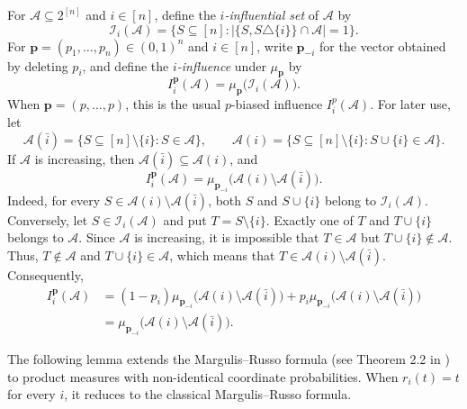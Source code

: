 \documentclass[11pt]{article}
\numberwithin{equation}{section}
\theoremstyle{definition}
\theoremstyle{remark}
\begin{document}
For $\mathcal{A}\subseteq2^{[n]}$ and $i\in[n]$, define the \textit{$i$-influential set} of $\mathcal{A}$ by
$$
        \mathcal{I}_i(\mathcal{A})
        =
        \{S\subseteq[n]:|\{S,S\triangle\{i\}\}\cap\mathcal{A}|=1\}.
$$
For $\mathbf p=(p_1,\ldots,p_n)\in(0,1)^n$ and $i\in[n]$, write
$\mathbf p_{-i}$ for the vector obtained by deleting $p_i$,  and define the \textit{$i$-influence} under $\mu_{\mathbf p}$ by
\begin{equation*}
 I_i^{\mathbf p}(\mathcal{A})
 =
 \mu_{\mathbf p}\bigl(\mathcal{I}_i(\mathcal{A})\bigr).
\end{equation*}
When $\mathbf p=(p,\ldots,p)$, this is the usual $p$-biased influence
$I_i^p(\mathcal{A})$.
For later use, let
\begin{equation*}
 \mathcal{A}(\bar{i})
 =
 \{S\subseteq[n]\setminus\{i\}:S\in\mathcal{A}\},
 \qquad
 \mathcal{A}(i)
 =
 \{S\subseteq[n]\setminus\{i\}:S\cup\{i\}\in\mathcal{A}\}.
\end{equation*}
If $\mathcal{A}$ is increasing, then
$ \mathcal{A}(\bar{i})\subseteq \mathcal{A}(i)$, and
\begin{equation*}
 I_i^{\mathbf p}(\mathcal{A})
 =
\mu_{\mathbf p_{-i}}
 \bigl( \mathcal{A}(i)\setminus \mathcal{A}(\bar{i})\bigr).
\end{equation*}
Indeed, for every
$S\in \mathcal{A}(i)\setminus \mathcal{A}(\bar{i})$, both $S$ and
$S\cup\{i\}$ belong to $\mathcal{I}_i(\mathcal{A})$. Conversely, let $S\in\mathcal{I}_i(\mathcal{A})$ and put
$T=S\setminus\{i\}$. Exactly one of $T$ and $T\cup\{i\}$ belongs to
$\mathcal{A}$. Since $\mathcal{A}$ is increasing, it is impossible
that $T\in\mathcal{A}$ but $T\cup\{i\}\notin\mathcal{A}$. Thus,
$T\notin\mathcal{A}$ and $T\cup\{i\}\in\mathcal{A}$, which means that
$
 T\in\mathcal{A}(i)\setminus\mathcal{A}(\bar{i}).
$
Consequently,
\begin{align*}
 I_i^{\mathbf p}(\mathcal{A})
 &=
(1- p_i)
 \mu_{\mathbf p_{-i}}
 \bigl(\mathcal{A}(i)\setminus\mathcal{A}(\bar{i})\bigr)
 +
p_i
 \mu_{\mathbf p_{-i}}
 \bigl(\mathcal{A}(i)\setminus\mathcal{A}(\bar{i})\bigr)\\
 &=
 \mu_{\mathbf p_{-i}}
 \bigl(\mathcal{A}(i)\setminus\mathcal{A}(\bar{i})\bigr).
\end{align*}

The following lemma extends the Margulis--Russo formula (see Theorem 2.2 in \cite{E24}) to product
measures with non-identical coordinate probabilities.
When $r_i(t)=t$ for every $i$, it reduces to the classical
Margulis--Russo formula.
\end{document}
